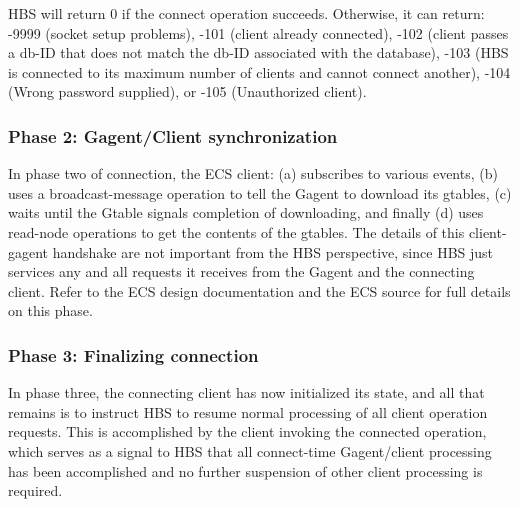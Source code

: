 HBS will return 0 if the connect operation succeeds. Otherwise, it can
return: -9999 (socket setup problems), -101 (client already connected),
-102 (client passes a db-ID that does not match the db-ID associated with
the database), -103 (HBS is connected to its maximum number of clients
and cannot connect another), -104 (Wrong password supplied), or 
-105 (Unauthorized client). 



\subsubsection*{Phase 2: Gagent/Client synchronization}

In phase two of connection, the ECS client: (a) subscribes to various
events, (b) uses a broadcast-message operation to tell the Gagent to
download its gtables, (c) waits until the Gtable signals completion of
downloading, and finally (d) uses read-node operations to get the contents
of the gtables.  The details of this client-gagent handshake are not
important from the HBS perspective, since HBS just services any and all
requests it receives from the Gagent and the connecting client.  Refer to
the ECS design documentation and the ECS source for full details on this
phase.

\subsubsection*{Phase 3: Finalizing connection}

In phase three, the connecting client has now initialized its state, and all that
remains is to instruct HBS to resume normal processing of all client
operation requests. This is accomplished by the client invoking the connected
operation, which serves as a signal to HBS that all connect-time Gagent/client
processing has been accomplished and no further suspension of other client 
processing is required.

